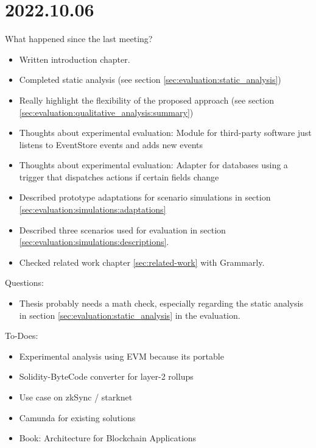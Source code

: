 \section{2022.10.06}
What happened since the last meeting?
\begin{itemize}
    \item Written introduction chapter.
    \item Completed static analysis (see section \ref{sec:evaluation:static_analysis})
    \item Really highlight the flexibility of the proposed approach (see section \ref{sec:evaluation:qualitative_analysis:summary})
    \item Thoughts about experimental evaluation: Module for third-party software just listens to EventStore events and adds new events
    \item Thoughts about experimental evaluation: Adapter for databases using a trigger that dispatches actions if certain fields change
    \item Described prototype adaptations for scenario simulations in section \ref{sec:evaluation:simulations:adaptations}
    \item Described three scenarios used for evaluation in section \ref{sec:evaluation:simulations:descriptions}.
    \item Checked related work chapter \ref{sec:related-work} with Grammarly.
\end{itemize}

Questions:
\begin{itemize}
    \item Thesis probably needs a math check, especially regarding the static analysis in section \ref{sec:evaluation:static_analysis} in the evaluation.
\end{itemize}

To-Does:
\begin{itemize}
    \item[\checkmark] Experimental analysis using EVM because its portable
    \item[\checkmark] Solidity-ByteCode converter for layer-2 rollups
    \item Use case on zkSync / starknet
    \item Camunda for existing solutions
    \item[\checkmark] Book: Architecture for Blockchain Applications
\end{itemize}


